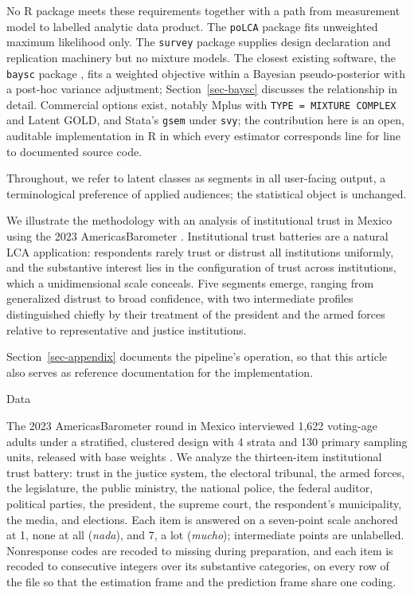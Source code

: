 \documentclass[
  12pt]{article}
\begin{document}
No R package meets these requirements together with a path from
measurement model to labelled analytic data product. The \texttt{poLCA}
package \citep{linzer2011} fits unweighted maximum likelihood only. The
\texttt{survey} package \citep{lumley2004, lumley2010} supplies design
declaration and replication machinery but no mixture models. The closest
existing software, the \texttt{baysc} package
\citep{wu2024, wu2026joss}, fits a weighted objective within a Bayesian
pseudo-posterior \citep{savitsky2016} with a post-hoc variance
adjustment; Section~\ref{sec-baysc} discusses the relationship in
detail. Commercial options exist, notably Mplus with
\texttt{TYPE\ =\ MIXTURE\ COMPLEX} and Latent GOLD, and Stata's
\texttt{gsem} under \texttt{svy}; the contribution here is an open,
auditable implementation in R in which every estimator corresponds line
for line to documented source code.

Throughout, we refer to latent classes as segments in all user-facing
output, a terminological preference of applied audiences; the
statistical object is unchanged.

We illustrate the methodology with an analysis of institutional trust in
Mexico using the 2023 AmericasBarometer \citep{lapop2023}. Institutional
trust batteries are a natural LCA application: respondents rarely trust
or distrust all institutions uniformly, and the substantive interest
lies in the configuration of trust across institutions, which a
unidimensional scale conceals. Five segments emerge, ranging from
generalized distrust to broad confidence, with two intermediate profiles
distinguished chiefly by their treatment of the president and the armed
forces relative to representative and justice institutions.

Section~\ref{sec-appendix} documents the pipeline's operation, so that
this article also serves as reference documentation for the
implementation.

Data

The 2023 AmericasBarometer round in Mexico interviewed 1,622 voting-age
adults under a stratified, clustered design with 4 strata and 130
primary sampling units, released with base weights \citep{lapop2023}. We
analyze the thirteen-item institutional trust battery: trust in the
justice system, the electoral tribunal, the armed forces, the
legislature, the public ministry, the national police, the federal
auditor, political parties, the president, the supreme court, the
respondent's municipality, the media, and elections. Each item is
answered on a seven-point scale anchored at 1, none at all
(\emph{nada}), and 7, a lot (\emph{mucho}); intermediate points are
unlabelled. Nonresponse codes are recoded to missing during preparation,
and each item is recoded to consecutive integers over its substantive
categories, on every row of the file so that the estimation frame and
the prediction frame share one coding.
\end{document}

